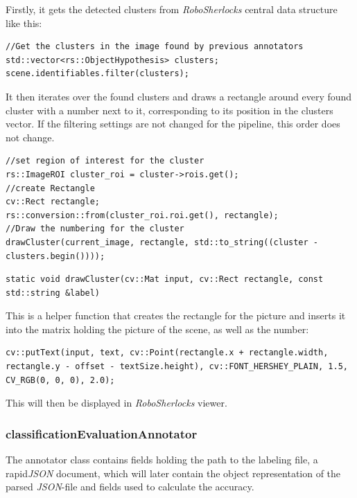 \documentclass[main.tex]{subfiles}
\begin{document}
Firstly, it gets the detected clusters from \textit{RoboSherlocks} central data structure like this: \label{getting the detected clusters.}

\begin{lstlisting}
//Get the clusters in the image found by previous annotators
std::vector<rs::ObjectHypothesis> clusters;
scene.identifiables.filter(clusters);
\end{lstlisting}

It then iterates over the found clusters and draws a rectangle around every found cluster with a number next to it, corresponding to its position in the clusters vector. If the filtering settings are not changed for the pipeline, this order does not change.

\begin{lstlisting}
//set region of interest for the cluster
rs::ImageROI cluster_roi = cluster->rois.get();
//create Rectangle
cv::Rect rectangle;
rs::conversion::from(cluster_roi.roi.get(), rectangle);
//Draw the numbering for the cluster
drawCluster(current_image, rectangle, std::to_string((cluster - clusters.begin())));
\end{lstlisting}

\begin{lstlisting}
static void drawCluster(cv::Mat input, cv::Rect rectangle, const std::string &label)
\end{lstlisting}

This is a helper function that creates the rectangle for the picture and inserts it into the matrix holding the picture of the scene, as well as the number:

\begin{lstlisting}
cv::putText(input, text, cv::Point(rectangle.x + rectangle.width, rectangle.y - offset - textSize.height), cv::FONT_HERSHEY_PLAIN, 1.5, CV_RGB(0, 0, 0), 2.0);
\end{lstlisting}

This will then be displayed in \textit{RoboSherlocks} viewer.



\subsubsection{classificationEvaluationAnnotator}
The annotator class contains fields holding the path to the labeling file, a rapid\textit{JSON} document, which will later contain the object representation of the parsed \textit{JSON}-file and fields used to calculate the accuracy.
\end{document}
